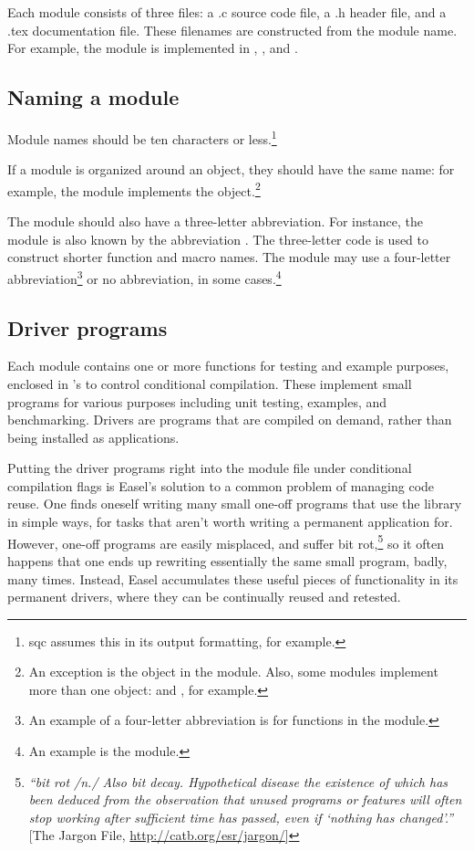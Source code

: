 Each module consists of three files: a .c source code file, a .h
header file, and a .tex documentation file. These filenames are
constructed from the module name. For example, the 
module is implemented in ,
, and .

\subsection{Naming a module}

Module names should be ten characters or less.\footnote{sqc assumes
  this in its output formatting, for example.}

If a module is organized around an object, they should have the same
name: for example, the  module implements the
 object.\footnote{An exception is the
 object in the  module. Also,
some modules implement more than one object:  and
, for example.}

The module should also have a three-letter abbreviation. For instance,
the  module is also known by the abbreviation
. The three-letter code is used to construct shorter
function and macro names. The module may use a four-letter
abbreviation\footnote{An example of a four-letter abbreviation is
 for functions in the  module.}  or
no abbreviation, in some cases.\footnote{An example is the
 module.}

\subsection{Driver programs}

Each module contains one or more  functions for testing
and example purposes, enclosed in 's to control
conditional compilation. These  implement small
programs for various purposes including unit testing, examples, and
benchmarking. Drivers are programs that are compiled on demand, rather
than being installed as applications.

Putting the driver programs right into the module  file
under conditional compilation flags is Easel's solution to a common
problem of managing code reuse. One finds oneself writing many small
one-off programs that use the library in simple ways, for tasks that
aren't worth writing a permanent application for.  However, one-off
programs are easily misplaced, and suffer bit
rot,\footnote{\emph{``bit rot /n./ Also bit decay. Hypothetical
disease the existence of which has been deduced from the observation
that unused programs or features will often stop working after
sufficient time has passed, even if `nothing has changed'.''} [The
Jargon File, \url{http://catb.org/esr/jargon/}]} so it often happens
that one ends up rewriting essentially the same small program, badly,
many times.  Instead, Easel accumulates these useful pieces of
functionality in its permanent drivers, where they can be continually
reused and retested.

